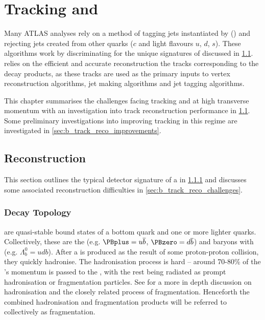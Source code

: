 \chapter{Tracking and \btagging}\label{chap:tracking}

Many ATLAS analyses rely on a method of tagging jets instantiated by \bquarks (\bjets) and rejecting jets created from other quarks ($c$ and light flavours $u$, $d$, $s$).
These \btagging algorithms work by discriminating for the unique signatures of \bjets discussed in \cref{sec:b_had_reco}.
\btagging relies on the efficient and accurate reconstruction the tracks corresponding to the \bhadron decay products,
as these tracks are used as the primary inputs to vertex reconstruction algorithms, jet making algorithms and jet tagging algorithms.

This chapter summarises the challenges facing tracking and \btagging at high transverse momentum with an investigation into track reconstruction performance in \cref{sec:b_had_reco}.
Some preliminary investigations into improving tracking in this regime are investigated in \cref{sec:b_track_reco_improvements}.


\section{\bhadron Reconstruction}
\label{sec:b_had_reco}

This section outlines the typical detector signature of a \bhadron in \cref{sec:b_decay_topology} and discusses some associated reconstruction difficulties in \cref{sec:b_track_reco_challenges}.


\subsection{Decay Topology}
\label{sec:b_decay_topology}

\bhadrons are quasi-stable bound states of a bottom quark and one or more lighter quarks.
Collectively, these are the \bmesons (e.g. $\PBplus = u \overline{b}$, $\PBzero = d \overline{b}$) and baryons with (e.g. $\Lambda_b^0 = udb$).
After a \bquark is produced as the result of some proton-proton collision, they quickly hadronise.
The hadronisation process is hard -- around 70-80\% of the \bquark's momentum is passed to the \bhadron, with the rest being radiated as prompt hadronisation or fragmentation particles.
See  for a more in depth discussion on hadronisation and the closely related process of fragmentation.
Henceforth the combined hadronisation and fragmentation products will be referred to collectively as fragmentation.

